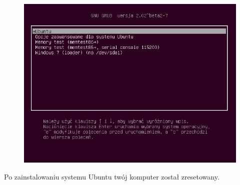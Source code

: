 \begin{figure}
		\includegraphics[width=\linewidth]{images/pierwsze_uruchomienie_grub.png}
\end{figure}

Po zainstalowaniu systemu Ubuntu twój komputer został zresetowany.
\clearpage